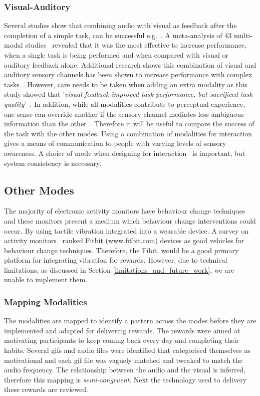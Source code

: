\subsubsection{Visual-Auditory}
Several studies show that combining audio with visual as feedback after the completion of a simple task, can be successful e.g.~\cite{benefits_of_audio_visual_1, benefits_of_audio_visual_2}. A meta-analysis of 43 multi-modal studies~\cite{comparing_modalities_effects_of_visual_auditory} revealed that it was the most effective to increase performance, when a single task is being performed and when compared with visual or auditory feedback alone. Additional research shows this combination of visual and auditory sensory channels has been shown to increase performance with complex tasks~\cite{chi_oussama_tap_the_shapetones}. However, care needs to be taken when adding an extra modality as this study showed that '\textit{visual feedback improved task performance, but sacrificed task quality}'~\cite{comparing_modalities_effects_of_visual_auditory}. In addition, while all modalities contribute to perceptual experience, one sense can override another if the sensory channel mediates less ambiguous information than the other~\cite{one_mode_override_another}. Therefore it will be useful to compare the success of the task with the other modes. Using a combination of modalities for interaction gives a means of communication to people with varying levels of sensory awareness. A choice of mode when designing for interaction~\cite{article_user_centred_multimodal_reminders} is important, but system consistency is necessary.


\subsection*{Other Modes}
The majority of electronic activity monitors have behaviour change techniques and these monitors present a medium which behaviour change interventions could occur. By using tactile vibration integrated into a wearable device. A survey on activity monitors~\cite{article_wearable_good} ranked Fitbit (www.fitbit.com) devices as good vehicles for behaviour change techniques. Therefore, the Fibit, would be a good primary platform for integrating vibration for rewards. However, due to technical limitations, as discussed in Section \ref{limitations_and_future_work}, we are unable to implement them.


\subsubsection*{Mapping Modalities}
The modalities are mapped to identify a pattern across the modes before they are implemented and adapted for delivering rewards. The rewards were aimed at motivating participants to keep coming back every day and completing their habits. Several gifs and audio files were identified that categorised themselves as motivational and each gif file was vaguely matched and tweaked to match the audio frequency. The relationship between the audio and the visual is inferred, therefore this mapping is \textit{semi-congruent}. Next the technology used to delivery these rewards are reviewed.

